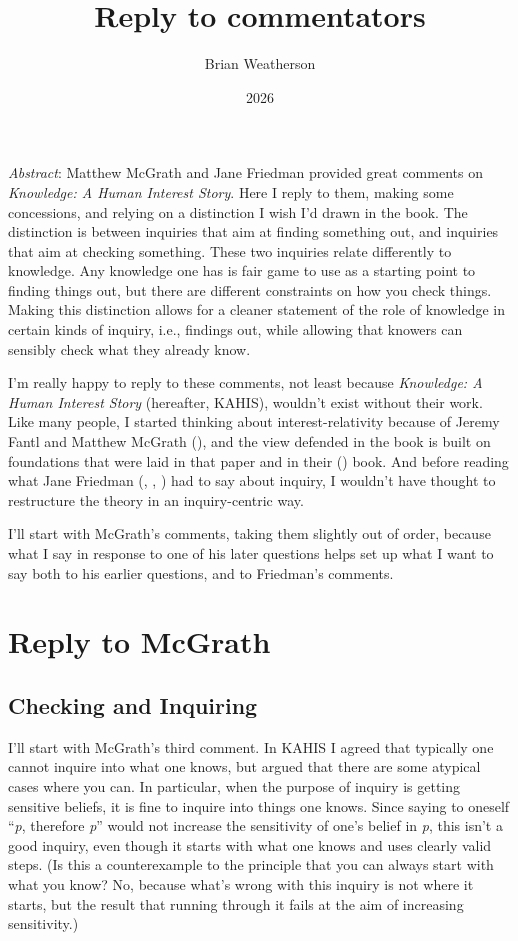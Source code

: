 \documentclass[
  11pt,
  letterpaper,
  DIV=11,
  numbers=noendperiod,
  twoside]{scrartcl}
\title{Reply to commentators}
\author{Brian Weatherson}
\date{2026}
\renewenvironment{abstract}
 {\vspace{-1.25cm}
 \quotation\small\noindent\emph{Abstract}:}
 {\endquotation}
\renewenvironment{abstract}
 {\quotation\small\noindent\emph{Abstract}:}
 {\endquotation\vspace{-0.02cm}}
\begin{document}
\maketitle
\begin{abstract}
Matthew McGrath and Jane Friedman provided great comments on
\emph{Knowledge: A Human Interest Story}. Here I reply to them, making
some concessions, and relying on a distinction I wish I'd drawn in the
book. The distinction is between inquiries that aim at finding something
out, and inquiries that aim at checking something. These two inquiries
relate differently to knowledge. Any knowledge one has is fair game to
use as a starting point to finding things out, but there are different
constraints on how you check things. Making this distinction allows for
a cleaner statement of the role of knowledge in certain kinds of
inquiry, i.e., findings out, while allowing that knowers can sensibly
check what they already know.
\end{abstract}


I'm really happy to reply to these comments, not least because
\emph{Knowledge: A Human Interest Story} (hereafter, KAHIS), wouldn't
exist without their work. Like many people, I started thinking about
interest-relativity because of Jeremy Fantl and Matthew McGrath
(), and the view defended in the
book is built on foundations that were laid in that paper and in their
() book. And before reading what
Jane Friedman (,
, )
had to say about inquiry, I wouldn't have thought to restructure the
theory in an inquiry-centric way.

I'll start with McGrath's comments, taking them slightly out of order,
because what I say in response to one of his later questions helps set
up what I want to say both to his earlier questions, and to Friedman's
comments.

\section{Reply to McGrath}\label{sec-mcgrath}

\subsection{Checking and Inquiring}\label{sec-mcgrath-checking}

I'll start with McGrath's third comment. In KAHIS I agreed that
typically one cannot inquire into what one knows, but argued that there
are some atypical cases where you can. In particular, when the purpose
of inquiry is getting sensitive beliefs, it is fine to inquire into
things one knows. Since saying to oneself ``\emph{p}, therefore
\emph{p}'' would not increase the sensitivity of one's belief in
\emph{p}, this isn't a good inquiry, even though it starts with what one
knows and uses clearly valid steps. (Is this a counterexample to the
principle that you can always start with what you know? No, because
what's wrong with this inquiry is not where it starts, but the result
that running through it fails at the aim of increasing sensitivity.)
\end{document}
